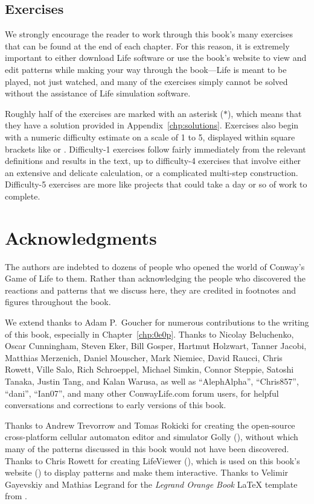 \subsection*{Exercises}

We strongly encourage the reader to work through this book's many exercises that can be found at the end of each chapter. For this reason, it is extremely important to either download Life software or use the book's website to view and edit patterns while making your way through the book---Life is meant to be played, not just watched, and many of the exercises simply cannot be solved without the assistance of Life simulation software.

Roughly half of the exercises are marked with an asterisk ($\ast$), which means that they have a solution provided in Appendix~\ref{chp:solutions}. Exercises also begin with a numeric difficulty estimate on a scale of 1 to 5, displayed within square brackets like  or . Difficulty-1 exercises follow fairly immediately from the relevant definitions and results in the text, up to difficulty-4 exercises that involve either an extensive and delicate calculation, or a complicated multi-step construction. Difficulty-5 exercises are more like projects that could take a day or so of work to complete.


\section*{Acknowledgments}

The authors are indebted to dozens of people who opened the world of Conway's Game of Life to them. Rather than acknowledging the people who discovered the reactions and patterns that we discuss here, they are credited in footnotes and figures throughout the book.

We extend thanks to Adam P.~Goucher for numerous contributions to the writing of this book, especially in Chapter~\ref{chp:0e0p}. Thanks to Nicolay Beluchenko, Oscar Cunningham, Steven Eker, Bill Gosper, Hartmut Holzwart, Tanner Jacobi, Matthias Merzenich, Daniel Mouscher, Mark Niemiec, David Raucci, Chris Rowett, Ville Salo, Rich Schroeppel, Michael Simkin, Connor Steppie, Satoshi Tanaka, Justin Tang, and Kalan Warusa, as well as ``AlephAlpha'', ``Chris857'', ``dani'', ``Ian07'', and many other ConwayLife.com forum users, for helpful conversations and corrections to early versions of this book.

Thanks to Andrew Trevorrow and Tomas Rokicki for creating the open-source cross-platform cellular automaton editor and simulator Golly (), without which many of the patterns discussed in this book would not have been discovered. Thanks to Chris Rowett for creating LifeViewer (), which is used on this book's website () to display patterns and make them interactive. Thanks to Velimir Gayevskiy and Mathias Legrand for the \emph{Legrand Orange Book} LaTeX template from .

